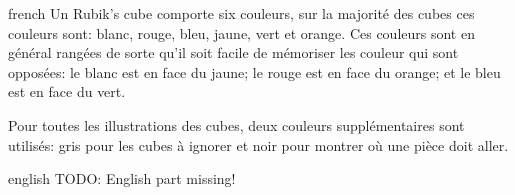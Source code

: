 \documentclass[0_Main.tex]{subfiles}
\begin{document}
\begin{shownto}{french}
Un Rubik's cube comporte six couleurs, sur la majorité des cubes ces couleurs sont: \colorbox{cblack}{\textcolor{cwhite}{blanc}}, \textcolor{cred}{rouge}, \textcolor{cblue}{bleu}, \textcolor{cyellow}{jaune}, \textcolor{cgreen}{vert} et \textcolor{corange}{orange}. Ces couleurs sont en général rangées de sorte qu'il soit facile de mémoriser les couleur qui sont opposées: le \colorbox{cblack}{\textcolor{cwhite}{blanc}} est en face du \textcolor{cyellow}{jaune}; le \textcolor{cred}{rouge} est en face du \textcolor{corange}{orange}; et le \textcolor{cblue}{bleu} est en face du \textcolor{cgreen}{vert}.

Pour toutes les illustrations des cubes, deux couleurs supplémentaires sont utilisés: \textcolor{cgray}{gris} pour les cubes à ignorer et \textcolor{cblack}{noir} pour montrer où une pièce doit aller.
\end{shownto}

\begin{shownto}{english}
TODO: English part missing! 
\end{shownto}

\clearpage


\end{document}
